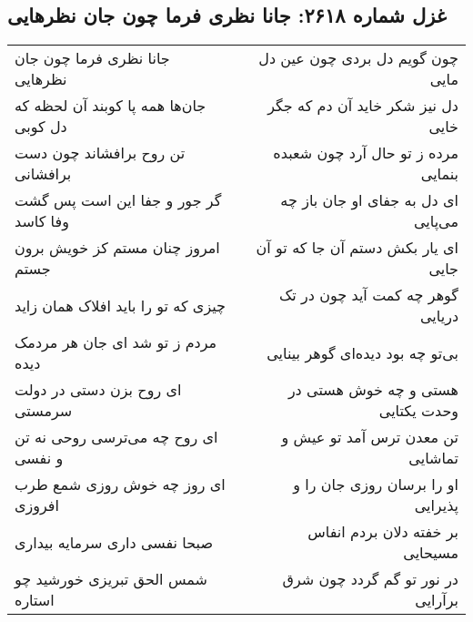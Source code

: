 \begin{center}
\section*{غزل شماره ۲۶۱۸: جانا نظری فرما چون جان نظرهایی}
\label{sec:2618}
\begin{longtable}{l p{0.5cm} r}
جانا نظری فرما چون جان نظرهایی
&&
چون گویم دل بردی چون عین دل مایی
\\
جان‌ها همه پا کوبند آن لحظه که دل کوبی
&&
دل نیز شکر خاید آن دم که جگر خایی
\\
تن روح برافشاند چون دست برافشانی
&&
مرده ز تو حال آرد چون شعبده بنمایی
\\
گر جور و جفا این است پس گشت وفا کاسد
&&
ای دل به جفای او جان باز چه می‌پایی
\\
امروز چنان مستم کز خویش برون جستم
&&
ای یار بکش دستم آن جا که تو آن جایی
\\
چیزی که تو را باید افلاک همان زاید
&&
گوهر چه کمت آید چون در تک دریایی
\\
مردم ز تو شد ای جان هر مردمک دیده
&&
بی‌تو چه بود دیده‌ای گوهر بینایی
\\
ای روح بزن دستی در دولت سرمستی
&&
هستی و چه خوش هستی در وحدت یکتایی
\\
ای روح چه می‌ترسی روحی نه تن و نفسی
&&
تن معدن ترس آمد تو عیش و تماشایی
\\
ای روز چه خوش روزی شمع طرب افروزی
&&
او را برسان روزی جان را و پذیرایی
\\
صبحا نفسی داری سرمایه بیداری
&&
بر خفته دلان بردم انفاس مسیحایی
\\
شمس الحق تبریزی خورشید چو استاره
&&
در نور تو گم گردد چون شرق برآرایی
\\
\end{longtable}
\end{center}
